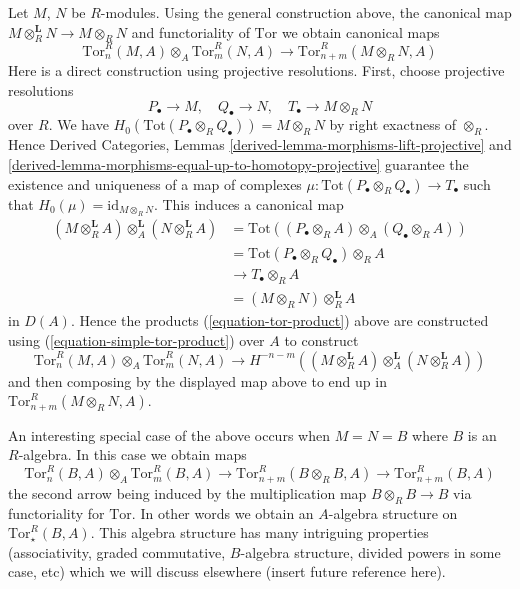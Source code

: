 \medskip\noindent
Let $M$, $N$ be $R$-modules. Using the general construction above,
the canonical map $M \otimes_R^\mathbf{L} N \to M \otimes_R N$ and
functoriality of $\text{Tor}$ we obtain canonical maps
\begin{equation}
\label{equation-tor-product}
\text{Tor}^R_n(M, A) \otimes_A \text{Tor}^R_m(N, A)
\longrightarrow \text{Tor}_{n + m}^R(M \otimes_R N, A)
\end{equation}
Here is a direct construction using projective resolutions. First, choose
projective resolutions
$$
P_\bullet \to M, \quad Q_\bullet \to N, \quad T_\bullet \to M \otimes_R N
$$
over $R$. We have
$H_0(\text{Tot}(P_\bullet \otimes_R Q_\bullet)) = M \otimes_R N$ by
right exactness of $\otimes_R$. Hence
Derived Categories, Lemmas \ref{derived-lemma-morphisms-lift-projective} and
\ref{derived-lemma-morphisms-equal-up-to-homotopy-projective}
guarantee the existence and uniqueness of a map of complexes
$\mu : \text{Tot}(P_\bullet \otimes_R Q_\bullet) \to T_\bullet$ such that
$H_0(\mu) = \text{id}_{M \otimes_R N}$. This induces a canonical map
\begin{align*}
(M \otimes_R^{\mathbf{L}} A) \otimes_A^{\mathbf{L}}
(N \otimes_R^{\mathbf{L}} A)
& =
\text{Tot}((P_\bullet \otimes_R A) \otimes_A (Q_\bullet \otimes_R A)) \\
& =
\text{Tot}(P_\bullet \otimes_R Q_\bullet) \otimes_R A \\
& \to
T_\bullet \otimes_R A \\
& = (M \otimes_R N) \otimes_R^{\mathbf{L}} A
\end{align*}
in $D(A)$. Hence the products (\ref{equation-tor-product}) above are
constructed using (\ref{equation-simple-tor-product}) over $A$ to construct
$$
\text{Tor}^R_n(M, A) \otimes_A \text{Tor}^R_m(N, A) \to
H^{-n-m}((M \otimes_R^{\mathbf{L}} A) \otimes_A^{\mathbf{L}}
(N \otimes_R^{\mathbf{L}} A))
$$
and then composing by the displayed map above to end up in
$\text{Tor}_{n + m}^R(M \otimes_R N, A)$.

\medskip\noindent
An interesting special case of the above occurs when $M = N = B$
where $B$ is an $R$-algebra. In this case we obtain maps
$$
\text{Tor}_n^R(B, A) \otimes_A \text{Tor}_m^R(B, A)
\longrightarrow
\text{Tor}_{n + m}^R(B \otimes_R B, A)
\longrightarrow
\text{Tor}_{n + m}^R(B, A)
$$
the second arrow being induced by the multiplication map
$B \otimes_R B \to B$ via functoriality for $\text{Tor}$.
In other words we obtain an $A$-algebra structure on
$\text{Tor}^R_{\star}(B, A)$. This algebra structure has many intriguing
properties (associativity, graded commutative, $B$-algebra structure,
divided powers in some case, etc) which we will discuss elsewhere (insert
future reference here).

